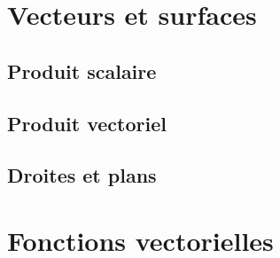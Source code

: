 \chapter{Vecteurs et surfaces}
\section{Produit scalaire}
\section{Produit vectoriel}
\section{Droites et plans}

\chapter{Fonctions vectorielles}